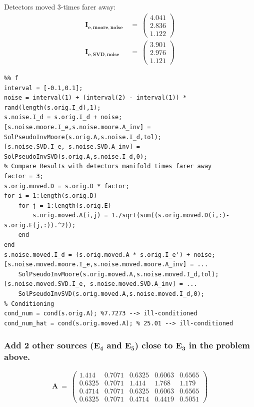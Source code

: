 Detectors moved 3-times farer away:
\begin{align}
\mathbf{I_{e,moore,noise}}\ &=\ \left(\begin{array}{c} 4.041\\ 2.836\\ 1.122 \end{array}\right)\\
\mathbf{I_{e,SVD,noise}}\ &=\ \left(\begin{array}{c} 3.901\\ 2.976\\ 1.121 \end{array}\right)
\end{align}

\begin{lstlisting}
%% f
interval = [-0.1,0.1];
noise = interval(1) + (interval(2) - interval(1)) * rand(length(s.orig.I_d),1);
s.noise.I_d = s.orig.I_d + noise;
[s.noise.moore.I_e,s.noise.moore.A_inv] = SolPseudoInvMoore(s.orig.A,s.noise.I_d,tol);
[s.noise.SVD.I_e, s.noise.SVD.A_inv] = SolPseudoInvSVD(s.orig.A,s.noise.I_d,0);
% Compare Results with detectors manifold times farer away
factor = 3;
s.orig.moved.D = s.orig.D * factor;
for i = 1:length(s.orig.D)
    for j = 1:length(s.orig.E)
        s.orig.moved.A(i,j) = 1./sqrt(sum((s.orig.moved.D(i,:)-s.orig.E(j,:)).^2));
    end
end
s.noise.moved.I_d = (s.orig.moved.A * s.orig.I_e') + noise;
[s.noise.moved.moore.I_e,s.noise.moved.moore.A_inv] = ...
    SolPseudoInvMoore(s.orig.moved.A,s.noise.moved.I_d,tol);
[s.noise.moved.SVD.I_e, s.noise.moved.SVD.A_inv] = ...
    SolPseudoInvSVD(s.orig.moved.A,s.noise.moved.I_d,0);
% Conditioning
cond_num = cond(s.orig.A); %7.7273 --> ill-conditioned
cond_num_hat = cond(s.orig.moved.A); % 25.01 --> ill-conditioned
\end{lstlisting}





\clearpage
\subsubsection{Add 2 other sources ($\mathbf{E_4}$ and $\mathbf{E_5}$) close to $\mathbf{E_3}$ in the problem above.}
\begin{equation}
\mathbf{A}\ =\ \left(\begin{array}{ccccc} 1.414 & 0.7071 & 0.6325 & 0.6063 & 0.6565\\ 0.6325 & 0.7071 & 1.414 & 1.768 & 1.179\\ 0.4714 & 0.7071 & 0.6325 & 0.6063 & 0.6565\\ 0.6325 & 0.7071 & 0.4714 & 0.4419 & 0.5051 \end{array}\right) 
\end{equation}

